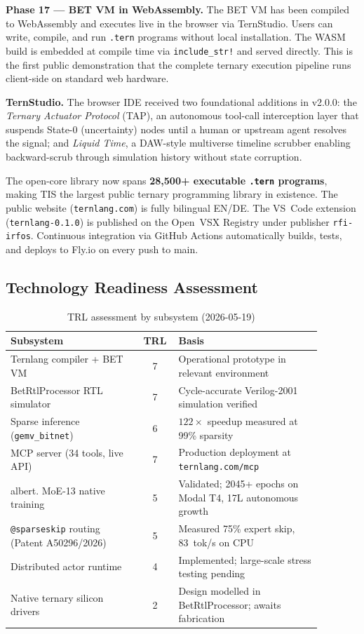 \documentclass[11pt,a4paper]{article}
\begin{document}
\textbf{Phase 17 --- BET VM in WebAssembly.} The BET VM has been compiled to WebAssembly
and executes live in the browser via TernStudio. Users can write, compile, and run
\texttt{.tern} programs without local installation. The WASM build is embedded at compile
time via \texttt{include\_str!} and served directly. This is the first public demonstration
that the complete ternary execution pipeline runs client-side on standard web hardware.

\textbf{TernStudio.} The browser IDE received two foundational additions in v2.0.0: the
\emph{Ternary Actuator Protocol} (TAP), an autonomous tool-call interception layer that
suspends State-0 (uncertainty) nodes until a human or upstream agent resolves the signal;
and \emph{Liquid Time}, a DAW-style multiverse timeline scrubber enabling backward-scrub
through simulation history without state corruption.

The open-core library now spans \textbf{28,500+ executable \texttt{.tern} programs}, making
TIS the largest public ternary programming library in existence. The public website
(\texttt{ternlang.com}) is fully bilingual EN/DE. The VS~Code extension
(\texttt{ternlang-0.1.0}) is published on the Open~VSX Registry under publisher
\texttt{rfi-irfos}. Continuous integration via GitHub Actions automatically builds, tests,
and deploys to Fly.io on every push to main.

\subsection*{Technology Readiness Assessment}

\begin{table}[htbp]
\centering
\small
\caption{TRL assessment by subsystem (2026-05-19)}
\label{tab:trl}
\begin{tabular}{@{}>{\raggedright\arraybackslash}p{0.42\linewidth} c >{\raggedright\arraybackslash}p{0.46\linewidth}@{}}
\toprule
Subsystem & TRL & Basis \\
\midrule
Ternlang compiler + BET VM & 7 & Operational prototype in relevant environment \\
BetRtlProcessor RTL simulator & 7 & Cycle-accurate Verilog-2001 simulation verified \\
Sparse inference (\texttt{gemv\_bitnet}) & 6 & $122\times$ speedup measured at 99\% sparsity \\
MCP server (34 tools, live API) & 7 & Production deployment at \texttt{ternlang.com/mcp} \\
albert. MoE-13 native training & 5 & Validated; 2045+ epochs on Modal T4, 17L autonomous growth \\
\texttt{@sparseskip} routing (Patent A50296/2026) & 5 & Measured 75\% expert skip, 83~tok/s on CPU \\
Distributed actor runtime & 4 & Implemented; large-scale stress testing pending \\
Native ternary silicon drivers & 2 & Design modelled in BetRtlProcessor; awaits fabrication \\
\bottomrule
\end{tabular}
\end{table}
\end{document}
